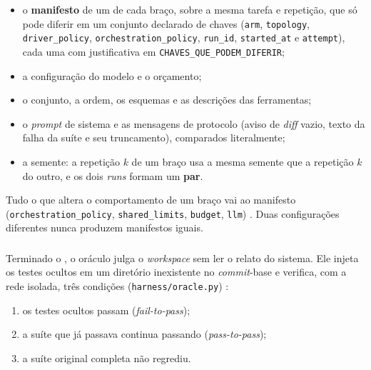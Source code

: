 \begin{itemize}
    \item o \textbf{manifesto} de um  de cada braço, sobre a mesma tarefa e repetição, que só pode diferir em um conjunto declarado de chaves (\texttt{arm}, \texttt{topology}, \texttt{driver\_policy}, \texttt{orchestration\_policy}, \texttt{run\_id}, \texttt{started\_at} e \texttt{attempt}), cada uma com justificativa em \texttt{CHAVES\_QUE\_PODEM\_DIFERIR};
    \item a configuração do modelo e o orçamento;
    \item o conjunto, a ordem, os esquemas e as descrições das ferramentas;
    \item o \textit{prompt} de sistema e as mensagens de protocolo (aviso de \textit{diff} vazio, texto da falha da suíte e seu truncamento), comparados literalmente;
    \item a semente: a repetição $k$ de um braço usa a mesma semente que a repetição $k$ do outro, e os dois \textit{runs} formam um \textbf{par}.
\end{itemize}

Tudo o que altera o comportamento de um braço vai ao manifesto (\texttt{orchestration\_policy}, \texttt{shared\_limits}, \texttt{budget}, \texttt{llm}) . Duas configurações diferentes nunca produzem manifestos iguais. 

\subsubsection{}

Terminado o , o oráculo julga o \textit{workspace} sem ler o relato do sistema. Ele injeta os testes ocultos em um diretório inexistente no \textit{commit}-base e verifica, com a rede isolada, três condições (\texttt{harness/oracle.py}) :

\begin{enumerate}
    \item os testes ocultos passam (\textit{fail-to-pass});
    \item a suíte que já passava continua passando (\textit{pass-to-pass});
    \item a suíte original completa não regrediu.
\end{enumerate}

